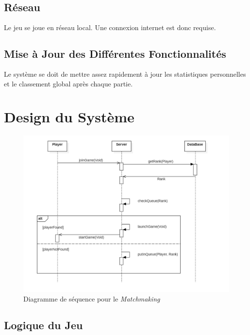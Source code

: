 \documentclass[10pt, a4paper]{article}
\begin{document}
\subsection{Réseau}
Le jeu se joue en réseau local. Une connexion internet est donc requise. \\

\subsection{Mise à Jour des Différentes Fonctionnalités}
Le système se doit de mettre assez rapidement à jour les statistiques personnelles et le classement global après chaque partie.

\section{Design du Système}

\begin{figure}[ht]
\centering
\includegraphics[scale=0.72]{SequenceDiagramMatchmaking.png}
\caption{Diagramme de séquence pour le \textit{Matchmaking}}
\label{SD_matchmaker} %
\end{figure}
\subsection{Logique du Jeu}
\end{document}
